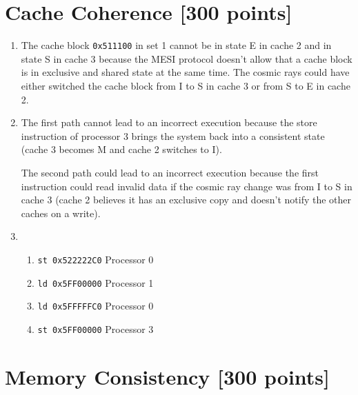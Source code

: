\documentclass[a4paper]{article}
\begin{document}
\section{Cache Coherence [300 points]}

\begin{enumerate}[label=\alph*)]
    \item The cache block \verb|0x511100| in set 1 cannot be in state E in cache
    2 and in state S in cache 3 because the MESI protocol doesn't allow that
      a cache block is in exclusive and shared state at the same time. The
        cosmic rays could have either switched the cache block from I to S in
        cache 3 or from S to E in cache 2.

    \item The first path cannot lead to an incorrect execution because the store
        instruction of processor 3 brings the system back into a consistent
        state (cache 3 becomes M and cache 2 switches to I).

        The second path could lead to an incorrect execution because the first
        instruction could read invalid data if the cosmic ray change was from
        I to S in cache 3 (cache 2 believes it has an exclusive copy and doesn't
        notify the other caches on a write).

    \item
        \begin{enumerate}[label=(\arabic*)]
            \item \verb|st 0x522222C0| Processor 0
            \item \verb|ld 0x5FF00000| Processor 1
            \item \verb|ld 0x5FFFFFC0| Processor 0
            \item \verb|st 0x5FF00000| Processor 3
        \end{enumerate}
\end{enumerate}

\section{Memory Consistency [300 points]}
\end{document}
